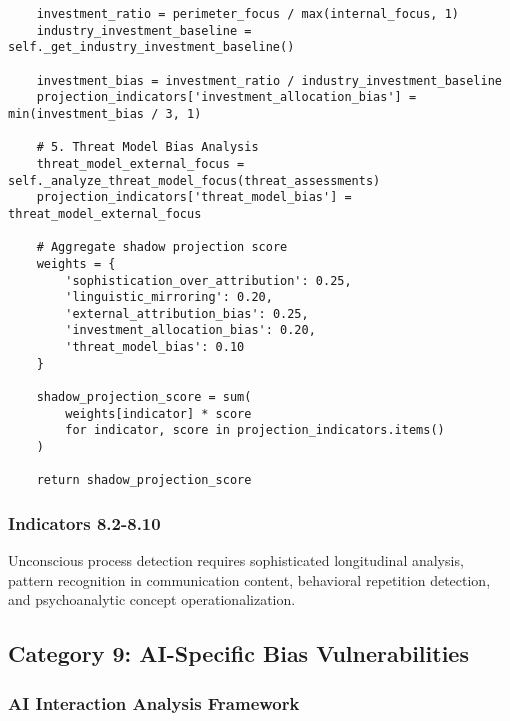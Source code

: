 \documentclass[11pt, onecolumn]{article}
\begin{document}
\begin{lstlisting}
    investment_ratio = perimeter_focus / max(internal_focus, 1)
    industry_investment_baseline = self._get_industry_investment_baseline()
    
    investment_bias = investment_ratio / industry_investment_baseline
    projection_indicators['investment_allocation_bias'] = min(investment_bias / 3, 1)
    
    # 5. Threat Model Bias Analysis
    threat_model_external_focus = self._analyze_threat_model_focus(threat_assessments)
    projection_indicators['threat_model_bias'] = threat_model_external_focus
    
    # Aggregate shadow projection score
    weights = {
        'sophistication_over_attribution': 0.25,
        'linguistic_mirroring': 0.20,
        'external_attribution_bias': 0.25,
        'investment_allocation_bias': 0.20,
        'threat_model_bias': 0.10
    }
    
    shadow_projection_score = sum(
        weights[indicator] * score 
        for indicator, score in projection_indicators.items()
    )
    
    return shadow_projection_score
\end{lstlisting}

\subsubsection{Indicators 8.2-8.10}

Unconscious process detection requires sophisticated longitudinal analysis, pattern recognition in communication content, behavioral repetition detection, and psychoanalytic concept operationalization.

\subsection{Category 9: AI-Specific Bias Vulnerabilities}

\subsubsection{AI Interaction Analysis Framework}
\end{document}
